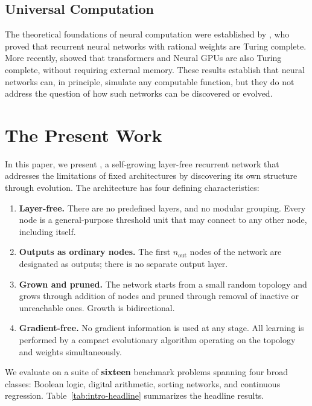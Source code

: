 \subsection{Universal Computation}

The theoretical foundations of neural computation were established by
\citet{siegelmann1995computational}, who proved that recurrent neural
networks with rational weights are Turing complete. More recently,
\citet{perez2021turing} showed that transformers and Neural GPUs are also
Turing complete, without requiring external memory. These results
establish that neural networks can, in principle, simulate any computable
function, but they do not address the question of how such networks can be
discovered or evolved.

\section{The Present Work}

In this paper, we present \modnet{}, a self-growing layer-free recurrent
network that addresses the limitations of fixed architectures by
discovering its own structure through evolution. The architecture has
four defining characteristics:

\begin{enumerate}
  \item \textbf{Layer-free.} There are no predefined layers, and no
    modular grouping. Every node is a general-purpose threshold unit that
    may connect to any other node, including itself.

  \item \textbf{Outputs as ordinary nodes.} The first $n_{\text{out}}$
    nodes of the network are designated as outputs; there is no separate
    output layer.

  \item \textbf{Grown and pruned.} The network starts from a small random
    topology and grows through addition of nodes and pruned through removal
    of inactive or unreachable ones. Growth is bidirectional.

  \item \textbf{Gradient-free.} No gradient information is used at any
    stage. All learning is performed by a compact evolutionary algorithm
    operating on the topology and weights simultaneously.
\end{enumerate}

We evaluate \modnet{} on a suite of \textbf{sixteen} benchmark problems
spanning four broad classes: Boolean logic, digital arithmetic,
sorting networks, and continuous regression. Table~\ref{tab:intro-headline}
summarizes the headline results.


